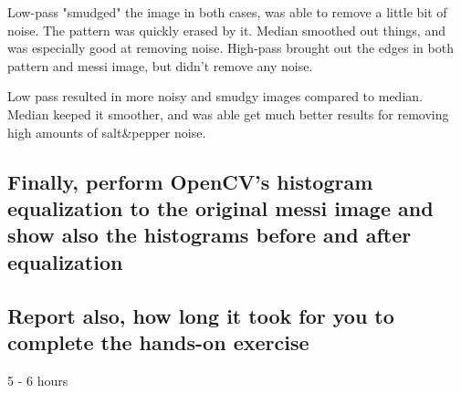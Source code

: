 \documentclass{article}
\begin{document}
 Low-pass "smudged" the image in both cases, was able to remove a little bit of noise. The pattern was quickly erased by it. Median smoothed out things, and was especially good at removing noise. High-pass brought out the edges in both pattern and messi image, but didn't remove any noise.

 Low pass resulted in more noisy and smudgy images compared to median. Median keeped it smoother, and was able get much better results for removing high amounts of salt\&pepper noise.

 \subsection{Finally, perform OpenCV’s histogram equalization to the original messi image and show also the histograms before and after equalization}

 \subsection{Report also, how long it took for you to complete the hands-on exercise}
    5 - 6 hours
\end{document}
